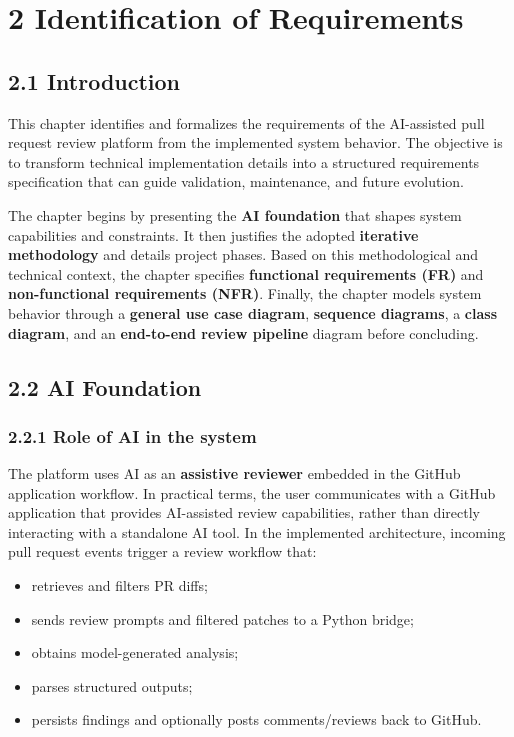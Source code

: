 \chapter{2 Identification of Requirements}

\section{2.1 Introduction}

This chapter identifies and formalizes the requirements of the AI-assisted pull request review platform from the implemented system behavior. The objective is to transform technical implementation details into a structured requirements specification that can guide validation, maintenance, and future evolution.

The chapter begins by presenting the \textbf{AI foundation} that shapes system capabilities and constraints. It then justifies the adopted \textbf{iterative methodology} and details project phases. Based on this methodological and technical context, the chapter specifies \textbf{functional requirements (FR)} and \textbf{non-functional requirements (NFR)}. Finally, the chapter models system behavior through a \textbf{general use case diagram}, \textbf{sequence diagrams}, a \textbf{class diagram}, and an \textbf{end-to-end review pipeline} diagram before concluding.

\section{2.2 AI Foundation}

\subsection{2.2.1 Role of AI in the system}

The platform uses AI as an \textbf{assistive reviewer} embedded in the GitHub application workflow. In practical terms, the user communicates with a GitHub application that provides AI-assisted review capabilities, rather than directly interacting with a standalone AI tool. In the implemented architecture, incoming pull request events trigger a review workflow that:
\begin{itemize}
    \item retrieves and filters PR diffs;
    \item sends review prompts and filtered patches to a Python bridge;
    \item obtains model-generated analysis;
    \item parses structured outputs;
    \item persists findings and optionally posts comments/reviews back to GitHub.
\end{itemize}

